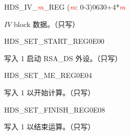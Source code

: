 


\begin{register}{H}{DS\_IV\_\textcolor{red}{\it{m}}\_REG (\textcolor{red}{\it{m}}: 0-3)}{\hexprefix{}0630+4*\textcolor{red}{\it{m}}}\label{regdesc:DSIVREG}
%
\regnewline%
\begin{regdesc}\begin{reglist}
\item [DS\_IV\_\textcolor{red}{\it{m}}\_REG (\textcolor{red}{\it{m}}: 0-3)] \begin{math}IV\end{math} block 数据。（只写）
\end{reglist}\end{regdesc}
\end{register}


\begin{register}{H}{DS\_SET\_START\_REG}{\hexprefix{}0E00}\label{regdesc:DSSETSTARTREG}
%
%
\regnewline%
\begin{regdesc}\begin{reglist}
\item [DS\_SET\_START] 写入 1 启动 RSA\_DS 外设。（只写）
\end{reglist}\end{regdesc}
\end{register}


\begin{register}{H}{DS\_SET\_ME\_REG}{\hexprefix{}0E04}\label{regdesc:DSSETMEREG}
%
%
\regnewline%
\begin{regdesc}\begin{reglist}
\item [DS\_SET\_ME] 写入 1 以开始计算。（只写）
\end{reglist}\end{regdesc}
\end{register}


\begin{register}{H}{DS\_SET\_FINISH\_REG}{\hexprefix{}0E08}\label{regdesc:DSSETFINISHREG}
%
%
\regnewline%
\begin{regdesc}\begin{reglist}
\item [DS\_SET\_FINISH] 写入 1 以结束运算。（只写）
\end{reglist}\end{regdesc}
\end{register}



